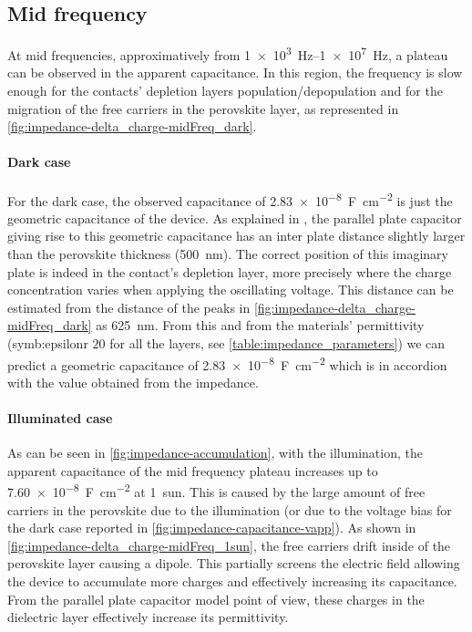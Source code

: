 	\subsection{Mid frequency}
	At mid frequencies, approximatively from \SIrange{1e3}{1e7}{\Hz}, a plateau can be observed in the apparent capacitance.
	In this region, the frequency is slow enough for the contacts' depletion layers population/depopulation and for the migration of the free carriers in the perovskite layer, as represented in \cref{fig:impedance-delta_charge-midFreq_dark}.
	
	\paragraph{Dark case}
	For the dark case, the observed capacitance of \SI{2.83e-8}{\farad\per\square\cm} is just the geometric capacitance of the device.
	As explained in , the parallel plate capacitor giving rise to this geometric capacitance has an inter plate distance slightly larger than the perovskite thickness (\SI{500}{\nm}).
	The correct position of this imaginary plate is indeed in the contact's depletion layer, more precisely where the charge concentration varies when applying the oscillating voltage.
	This distance can be estimated from the distance of the peaks in \cref{fig:impedance-delta_charge-midFreq_dark} as \SI{625}{\nm}.
	From this and from the materials' permittivity (\gls{symb:epsilonr} $20$ for all the layers, see \cref{table:impedance_parameters}) we can predict a geometric capacitance of \SI{2.83e-8}{\farad\per\square\cm} which is in accordion with the value obtained from the impedance.
	

		\paragraph{Illuminated case}
		As can be seen in \cref{fig:impedance-accumulation}, with the illumination, the apparent capacitance of the mid frequency plateau increases up to \SI{7.60e-8}{\farad\per\square\cm} at \SI{1}{sun}.
		This is caused by the large amount of free carriers in the perovskite due to the illumination (or due to the voltage bias for the dark case reported in \cref{fig:impedance-capacitance-vapp}).
		As shown in \cref{fig:impedance-delta_charge-midFreq_1sun}, the free carriers drift inside of the perovskite layer causing a dipole.
		This partially screens the electric field allowing the device to accumulate more charges and effectively increasing its capacitance.
		From the parallel plate capacitor model point of view, these charges in the dielectric layer effectively increase its permittivity.

